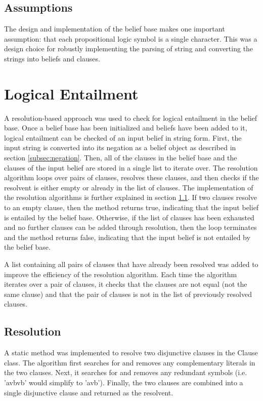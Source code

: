 \documentclass[a4paper,10pt]{article}
\begin{document}
\subsection{Assumptions}
\label{subsec:assumptions}
The design and implementation of the belief base makes one important assumption: that each propositional logic symbol is a single character. This was a design choice for robustly implementing the parsing of string and converting the strings into beliefs and clauses.

\section{Logical Entailment}
\label{sec:entail}
A resolution-based approach was used to check for logical entailment in the belief base. Once a belief base has been initialized and beliefs have been added to it, logical entailment can be checked of an input belief in string form. First, the input string is converted into its negation as a belief object as described in section \ref{subsec:negation}. Then, all of the clauses in the belief base and the clauses of the input belief are stored in a single list to iterate over. The resolution algorithm loops over pairs of clauses, resolves these clauses, and then checks if the resolvent is either empty or already in the list of clauses. The implementation of the resolution algorithms is further explained in section \ref{subsec:resolution}. If two clauses resolve to an empty clause, then the method returns true, indicating that the input belief is entailed by the belief base. Otherwise, if the list of clauses has been exhausted and no further clauses can be added through resolution, then the loop terminates and the method returns false, indicating that the input belief is not entailed by the belief base.

A list containing all pairs of clauses that have already been resolved was added to improve the efficiency of the resolution algorithm. Each time the algorithm iterates over a pair of clauses, it checks that the clauses are not equal (not the same clause) and that the pair of clauses is not in the list of previously resolved clauses.

\subsection{Resolution}
\label{subsec:resolution}
A static method was implemented to resolve two disjunctive clauses in the Clause class. The algorithm first searches for and removes any complementary literals
in the two clauses. Next, it searches for and removes any redundant symbols (i.e. 'avbvb' would simplify to 'avb'). Finally, the two clauses are combined into
a single disjunctive clause and returned as the resolvent.
\end{document}
